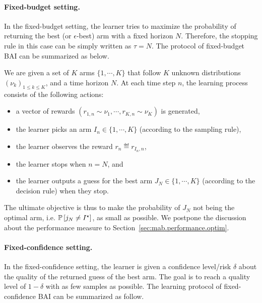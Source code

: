 \paragraph{Fixed-budget setting.}

In the fixed-budget setting, the learner tries to maximize the probability of returning the best (or $\epsilon$-best) arm with a fixed horizon $N$. Therefore, the stopping rule in this case can be simply written as $\tau=N$. The protocol of fixed-budget BAI can be summarized as below.

\begin{definition}\label{def:mab.bai_budget}
\begin{leftbar}[defnbar]
	We are given a set of $K$ arms $\{1,\cdots,K\}$ that follow $K$ unknown distributions $(\nu_k)_{1 \leq k \leq K}$, and a time horizon $N$. At each time step $n$, the learning process consists of the following actions:
\begin{itemize}
	\item a vector of rewards $(r_{1,n} \sim \nu_1, \cdots, r_{K,n} \sim \nu_K)$ is generated,
	\item the learner picks an arm $I_n \in \{1,\cdots,K\}$ (according to the sampling rule),
	\item the learner observes the reward $r_n \eqdef r_{I_n, n}$,
	\item the learner stops when $n=N$, and
	\item the learner outputs a guess for the best arm $J_N \in \{1,\cdots,K\}$ (according to the decision rule) when they stop.
\end{itemize}
\end{leftbar}
\end{definition}

The ultimate objective is thus to make the probability of $J_N$ not being the optimal arm, i.e. $\mathbb{P}\left[j_N\neq I^\star\right]$, as small as possible. We postpone the discussion about the performance measure to Section~\ref{sec:mab.performance.optim}.

\paragraph{Fixed-confidence setting.}

In the fixed-confidence setting, the learner is given a confidence level/risk $\delta$ about the quality of the returned guess of the best arm. The goal is to reach a quality level of $1-\delta$ with as few samples as possible. The learning protocol of fixed-confidence BAI can be summarized as follow.

